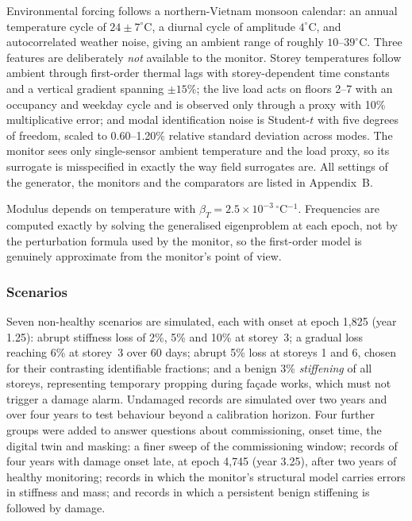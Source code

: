 \documentclass[12pt,a4paper]{article}
\newcommand{\rev}[1]{#1}
\newcommand{\rev}[1]{{\color{revcol}#1}}
\begin{document}
Environmental forcing follows a northern-Vietnam monsoon calendar: an annual temperature cycle of $24\pm7^\circ$C, a diurnal cycle of amplitude $4^\circ$C, and autocorrelated weather noise, giving an ambient range of roughly $10$--$39^\circ$C. Three features are deliberately \emph{not} available to the monitor. Storey temperatures follow ambient through first-order thermal lags with storey-dependent time constants and a vertical gradient spanning $\pm15\%$; the live load acts on floors 2--7 with an occupancy and weekday cycle and is observed only through a proxy with 10\% multiplicative error; and modal identification noise is Student-$t$ with five degrees of freedom, scaled to 0.60--1.20\% relative standard deviation across modes. The monitor sees only single-sensor ambient temperature and the load proxy, so its surrogate is misspecified in exactly the way field surrogates are. \rev{All settings of the generator, the monitors and the comparators are listed in Appendix~B.}

Modulus depends on temperature with $\beta_T=2.5\times10^{-3}$\,$^\circ$C$^{-1}$. Frequencies are computed exactly by solving the generalised eigenproblem at each epoch, not by the perturbation formula used by the monitor, so the first-order model is genuinely approximate from the monitor's point of view.

\subsubsection{Scenarios}

Seven non-healthy scenarios are simulated, each with onset at epoch 1{,}825 (year 1.25): abrupt stiffness loss of 2\%, 5\% and 10\% at storey~3; a gradual loss reaching 6\% at storey~3 over 60 days; abrupt 5\% loss at storeys 1 and 6, chosen for their contrasting identifiable fractions; and a benign 3\% \emph{stiffening} of all storeys, representing temporary propping during façade works, which must not trigger a damage alarm. Undamaged records are simulated over two years and over four years to test behaviour beyond a calibration horizon. \rev{Four further groups were added to answer questions about commissioning, onset time, the digital twin and masking: a finer sweep of the commissioning window; records of four years with damage onset late, at epoch 4{,}745 (year 3.25), after two years of healthy monitoring; records in which the monitor's structural model carries errors in stiffness and mass; and records in which a persistent benign stiffening is followed by damage.}
\end{document}
